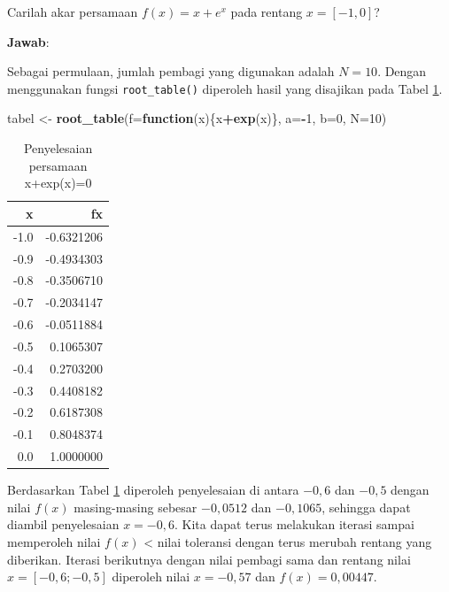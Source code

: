 \documentclass[]{book}
\newenvironment{Shaded}{\begin{snugshade}}{\end{snugshade}}
\newcommand{\ControlFlowTok}[1]{\textcolor[rgb]{0.13,0.29,0.53}{\textbf{#1}}}
\newcommand{\DataTypeTok}[1]{\textcolor[rgb]{0.13,0.29,0.53}{#1}}
\newcommand{\DecValTok}[1]{\textcolor[rgb]{0.00,0.00,0.81}{#1}}
\newcommand{\KeywordTok}[1]{\textcolor[rgb]{0.13,0.29,0.53}{\textbf{#1}}}
\newcommand{\NormalTok}[1]{#1}
\newcommand{\OperatorTok}[1]{\textcolor[rgb]{0.81,0.36,0.00}{\textbf{#1}}}
\newcommand{\StringTok}[1]{\textcolor[rgb]{0.31,0.60,0.02}{#1}}
\theoremstyle{definition}
\theoremstyle{definition}
\theoremstyle{definition}
\theoremstyle{remark}
\let\BeginKnitrBlock\begin \let\EndKnitrBlock\end
\begin{document}
\BeginKnitrBlock{example}
\protect\hypertarget{exm:tabelexmp}{}{\label{exm:tabelexmp} }Carilah akar persamaan \(f\left(x \right)=x+e^{x}\) pada rentang \(x=\left[-1,0 \right]\)?
\EndKnitrBlock{example}

\textbf{Jawab}:

Sebagai permulaan, jumlah pembagi yang digunakan adalah \(N=10\). Dengan menggunakan fungsi \texttt{root\_table()} diperoleh hasil yang disajikan pada Tabel \ref{tab:tabeltabel}.

\begin{Shaded}
\begin{Highlighting}[]
\NormalTok{tabel <-}\StringTok{ }\KeywordTok{root_table}\NormalTok{(}\DataTypeTok{f=}\ControlFlowTok{function}\NormalTok{(x)\{x}\OperatorTok{+}\KeywordTok{exp}\NormalTok{(x)\},}
                     \DataTypeTok{a=}\OperatorTok{-}\DecValTok{1}\NormalTok{, }\DataTypeTok{b=}\DecValTok{0}\NormalTok{, }\DataTypeTok{N=}\DecValTok{10}\NormalTok{)}
\end{Highlighting}
\end{Shaded}

\begin{table}[t]

\caption{\label{tab:tabeltabel}Penyelesaian persamaan x+exp(x)=0}
\centering
\begin{tabular}{r|r}
\hline
x & fx\\
\hline
-1.0 & -0.6321206\\
\hline
-0.9 & -0.4934303\\
\hline
-0.8 & -0.3506710\\
\hline
-0.7 & -0.2034147\\
\hline
-0.6 & -0.0511884\\
\hline
-0.5 & 0.1065307\\
\hline
-0.4 & 0.2703200\\
\hline
-0.3 & 0.4408182\\
\hline
-0.2 & 0.6187308\\
\hline
-0.1 & 0.8048374\\
\hline
0.0 & 1.0000000\\
\hline
\end{tabular}
\end{table}

Berdasarkan Tabel \ref{tab:tabeltabel} diperoleh penyelesaian di antara \(-0,6\) dan \(-0,5\) dengan nilai \(f\left(x \right)\) masing-masing sebesar \(-0,0512\) dan \(-0,1065\), sehingga dapat diambil penyelesaian \(x=-0,6\). Kita dapat terus melakukan iterasi sampai memperoleh nilai \(f\left(x \right)\) \textless{} nilai toleransi dengan terus merubah rentang yang diberikan. Iterasi berikutnya dengan nilai pembagi sama dan rentang nilai \(x=\left[-0,6;-0,5\right]\) diperoleh nilai \(x=-0,57\) dan \(f\left(x \right)=0,00447\).
\end{document}
